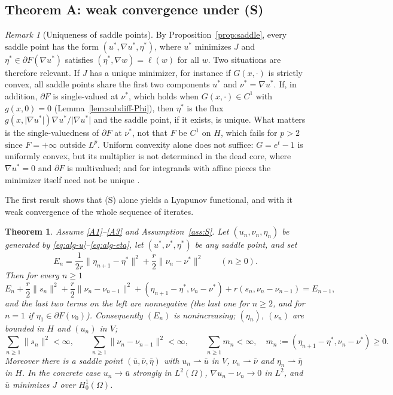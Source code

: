\documentclass[11pt]{amsart}
\newtheorem{maintheorem}{Theorem}
\theoremstyle{definition}
\theoremstyle{remark}
\newtheorem{remark}[theorem]{Remark}
\numberwithin{equation}{section}
\newcommand{\abs}[1]{\lvert #1\rvert}
\newcommand{\norm}[1]{\lVert #1\rVert}
\newcommand{\weak}{\rightharpoonup}
\begin{document}
\subsection{Theorem A: weak convergence under (S)}\label{ssec:thmA}
\begin{remark}[Uniqueness of saddle points]\label{rem:unique}
By Proposition~\ref{prop:saddle}, every saddle point has the form $(u^*,\nabla u^*,\eta^*)$, where $u^*$ minimizes $J$ and $\eta^*\in\partial F(\nabla u^*)$ satisfies $(\eta^*,\nabla w)=\ell(w)$ for all $w$. Two situations are therefore relevant. If $J$ has a unique minimizer, for instance if $G(x,\cdot)$ is strictly convex, all saddle points share the first two components $u^*$ and $\nu^*=\nabla u^*$. If, in addition, $\partial F$ is single-valued at $\nu^*$, which holds when $G(x,\cdot)\in C^1$ with $g(x,0)=0$ (Lemma~\ref{lem:subdiff-Phi}), then $\eta^*$ is the flux $g(x,\abs{\nabla u^*})\nabla u^*/\abs{\nabla u^*}$ and the saddle point, if it exists, is unique. What matters is the single-valuedness of $\partial F$ at $\nu^*$, not that $F$ be $C^1$ on $H$, which fails for $p>2$ since $F=+\infty$ outside $L^p$. Uniform convexity alone does not suffice: $G=e^t-1$ is uniformly convex, but its multiplier is not determined in the dead core, where $\nabla u^*=0$ and $\partial F$ is multivalued; and for integrands with affine pieces the minimizer itself need not be unique \cite{CarstensenLiu2015}.
\end{remark}

The first result shows that (S) alone yields a Lyapunov functional, and with it weak convergence of the whole sequence of iterates.

\begin{maintheorem}\label{thm:A}
Assume \ref{A1}--\ref{A3} and Assumption~\ref{ass:S}. Let $(u_n,\nu_n,\eta_n)$ be generated by \eqref{eq:alg-u}--\eqref{eq:alg-eta}, let $(u^*,\nu^*,\eta^*)$ be any saddle point, and set
\[
E_n=\frac1{2r}\norm{\eta_{n+1}-\eta^*}^2+\frac r2\norm{\nu_n-\nu^*}^2\qquad(n\ge0).
\]
Then for every $n\ge1$
\begin{equation}\label{eq:lyap}
E_n+\frac r2\norm{s_n}^2+\frac r2\norm{\nu_n-\nu_{n-1}}^2+(\eta_{n+1}-\eta^*,\nu_n-\nu^*)+r(s_n,\nu_n-\nu_{n-1})=E_{n-1},
\end{equation}
and the last two terms on the left are nonnegative \textup(the last one for $n\ge2$, and for $n=1$ if $\eta_1\in\partial F(\nu_0)$\textup). Consequently $(E_n)$ is nonincreasing; $(\eta_n)$, $(\nu_n)$ are bounded in $H$ and $(u_n)$ in $V$;
\[
\sum_{n\ge1}\norm{s_n}^2<\infty,\qquad\sum_{n\ge1}\norm{\nu_n-\nu_{n-1}}^2<\infty,\qquad\sum_{n\ge1}m_n<\infty,\quad m_n:=(\eta_{n+1}-\eta^*,\nu_n-\nu^*)\ge0 .
\]
Moreover there is a saddle point $(\bar u,\bar\nu,\bar\eta)$ with $u_n\weak\bar u$ in $V$, $\nu_n\weak\bar\nu$ and $\eta_n\weak\bar\eta$ in $H$. In the concrete case $u_n\to\bar u$ strongly in $L^2(\Omega)$, $\nabla u_n-\nu_n\to0$ in $L^2$, and $\bar u$ minimizes $J$ over $H^1_0(\Omega)$.
\end{maintheorem}
\end{document}
